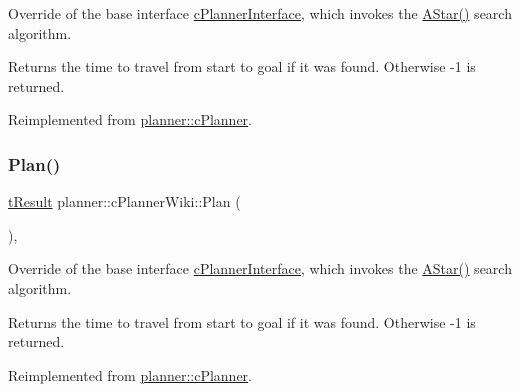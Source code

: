 Override of the base interface \mbox{\hyperlink{classplanner_1_1c_planner_interface}{c\+Planner\+Interface}}, which invokes the \mbox{\hyperlink{classplanner_1_1c_planner_wiki_aa673ebc2b1b43af3b13fb0c958c5f2e4}{A\+Star()}} search algorithm. 

\begin{DoxyReturn}{Returns}
the time to travel from start to goal if it was found. Otherwise -\/1 is returned. 
\end{DoxyReturn}


Reimplemented from \mbox{\hyperlink{classplanner_1_1c_planner_a21230c015260b9fc34ad2f239592470e}{planner\+::c\+Planner}}.

\mbox{\label{classplanner_1_1c_planner_wiki_a9d18be721400b51162ff463ab11d1721}} 
\subsubsection{\texorpdfstring{Plan()}{Plan()}\hspace{0.1cm}{\footnotesize\ttfamily [2/2]}}
{\footnotesize\ttfamily \mbox{\hyperlink{structt_result}{t\+Result}} planner\+::c\+Planner\+Wiki\+::\+Plan (\begin{DoxyParamCaption}{ }\end{DoxyParamCaption})\hspace{0.3cm}{\ttfamily [override]}, {\ttfamily [virtual]}}



Override of the base interface \mbox{\hyperlink{classplanner_1_1c_planner_interface}{c\+Planner\+Interface}}, which invokes the \mbox{\hyperlink{classplanner_1_1c_planner_wiki_aa673ebc2b1b43af3b13fb0c958c5f2e4}{A\+Star()}} search algorithm. 

\begin{DoxyReturn}{Returns}
the time to travel from start to goal if it was found. Otherwise -\/1 is returned. 
\end{DoxyReturn}


Reimplemented from \mbox{\hyperlink{classplanner_1_1c_planner_a21230c015260b9fc34ad2f239592470e}{planner\+::c\+Planner}}.

\mbox{\label{classplanner_1_1c_planner_wiki_a049e5c4a9540fecbe82a0648f771bbd2}} 
